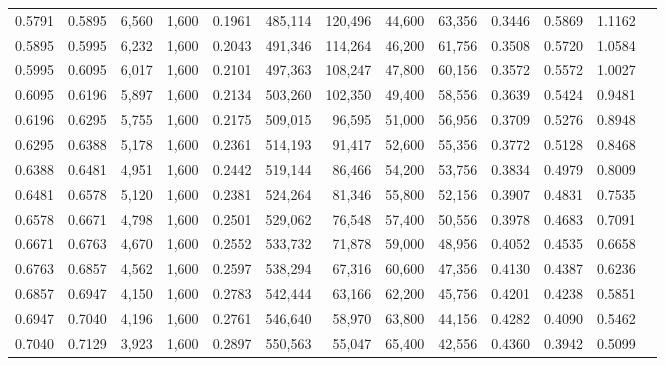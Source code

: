 \begin{tabular}{rrrrrrrrrrrrr}
0.5791 & 0.5895 &  6,560 & 1,600 &                                     0.1961 & 485,114 & 120,496 &  44,600 &  63,356 & 0.3446 & 0.5869 & 1.1162 \\
0.5895 & 0.5995 &  6,232 & 1,600 &                                     0.2043 & 491,346 & 114,264 &  46,200 &  61,756 & 0.3508 & 0.5720 & 1.0584 \\
0.5995 & 0.6095 &  6,017 & 1,600 &                                     0.2101 & 497,363 & 108,247 &  47,800 &  60,156 & 0.3572 & 0.5572 & 1.0027 \\
0.6095 & 0.6196 &  5,897 & 1,600 &                                     0.2134 & 503,260 & 102,350 &  49,400 &  58,556 & 0.3639 & 0.5424 & 0.9481 \\
0.6196 & 0.6295 &  5,755 & 1,600 &                                     0.2175 & 509,015 &  96,595 &  51,000 &  56,956 & 0.3709 & 0.5276 & 0.8948 \\
0.6295 & 0.6388 &  5,178 & 1,600 &                                     0.2361 & 514,193 &  91,417 &  52,600 &  55,356 & 0.3772 & 0.5128 & 0.8468 \\
0.6388 & 0.6481 &  4,951 & 1,600 &                                     0.2442 & 519,144 &  86,466 &  54,200 &  53,756 & 0.3834 & 0.4979 & 0.8009 \\
0.6481 & 0.6578 &  5,120 & 1,600 &                                     0.2381 & 524,264 &  81,346 &  55,800 &  52,156 & 0.3907 & 0.4831 & 0.7535 \\
0.6578 & 0.6671 &  4,798 & 1,600 &                                     0.2501 & 529,062 &  76,548 &  57,400 &  50,556 & 0.3978 & 0.4683 & 0.7091 \\
0.6671 & 0.6763 &  4,670 & 1,600 &                                     0.2552 & 533,732 &  71,878 &  59,000 &  48,956 & 0.4052 & 0.4535 & 0.6658 \\
0.6763 & 0.6857 &  4,562 & 1,600 &                                     0.2597 & 538,294 &  67,316 &  60,600 &  47,356 & 0.4130 & 0.4387 & 0.6236 \\
0.6857 & 0.6947 &  4,150 & 1,600 &                                     0.2783 & 542,444 &  63,166 &  62,200 &  45,756 & 0.4201 & 0.4238 & 0.5851 \\
0.6947 & 0.7040 &  4,196 & 1,600 &                                     0.2761 & 546,640 &  58,970 &  63,800 &  44,156 & 0.4282 & 0.4090 & 0.5462 \\
0.7040 & 0.7129 &  3,923 & 1,600 &                                     0.2897 & 550,563 &  55,047 &  65,400 &  42,556 & 0.4360 & 0.3942 & 0.5099 \\

\end{tabular}
